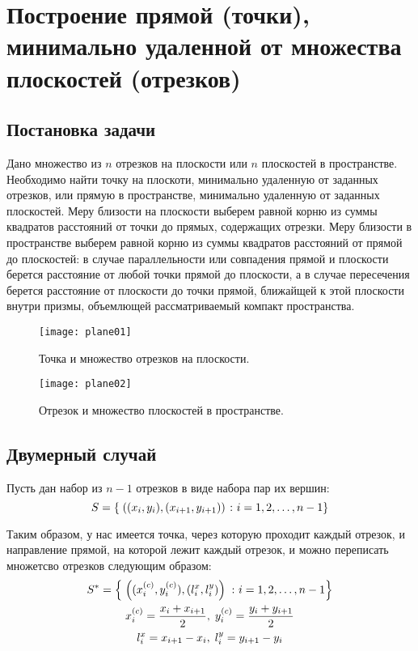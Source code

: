 \section{Построение прямой (точки), минимально удаленной от множества плоскостей (отрезков)}\label{plane}

\subsection{Постановка задачи}\label{plane:task}

Дано множество из $n$ отрезков на плоскости или $n$ плоскостей в пространстве. Необходимо найти точку на плоскоти, минимально удаленную от заданных отрезков, или прямую в пространстве, минимально удаленную от заданных плоскостей. Меру близости на плоскости выберем равной корню из суммы квадратов расстояний от точки до прямых, содержащих отрезки. Меру близости в пространстве выберем равной корню из суммы квадратов расстояний от прямой до плоскостей: в случае параллельности или совпадения прямой и плоскости берется расстояние от любой точки прямой до плоскости, а в случае пересечения берется расстояние от плоскости до точки прямой, ближайщей к этой плоскости внутри призмы, объемлющей рассматриваемый компакт пространства. 

\begin{figure}[h]
	{ \noindent \centering
	\texttt{[image: plane01]}
	\caption{Точка и множество отрезков на плоскости.}
	}
\end{figure}

\begin{figure}[h]
	{ \noindent \centering
	\texttt{[image: plane02]}
	\caption{Отрезок и множество плоскостей в пространстве.}
	}
\end{figure}

\newpage
\subsection{Двумерный случай}\label{plane:alg:2dim}

Пусть дан набор из $n-1$ отрезков в виде набора пар их вершин: 
$$S = \left\{\;((x_i, y_i), (x_{i+1}, y_{i+1}))\;\colon i = 1,2,\dots,n-1\right\}$$

Таким образом, у нас имеется точка, через которую проходит каждый отрезок, и направление прямой, на которой лежит каждый отрезок, и можно переписать множетсво отрезков следующим образом:
$$\begin{gathered}
	S^* =\left\{\; \left( (x_i^{(c)}, y_i^{(c)}), (l_i^x, l_i^y) \right) \;\colon i= 1,2,\dots,n-1\right\} \\
	x_i^{(c)} = \frac{x_i + x_{i+1}}{2}, \; y_i^{(c)} = \frac{y_i + y_{i+1}}{2} \\
	l_i^x = x_{i+1} - x_i, \; l_i^y = y_{i+1} - y_i
\end{gathered}$$

